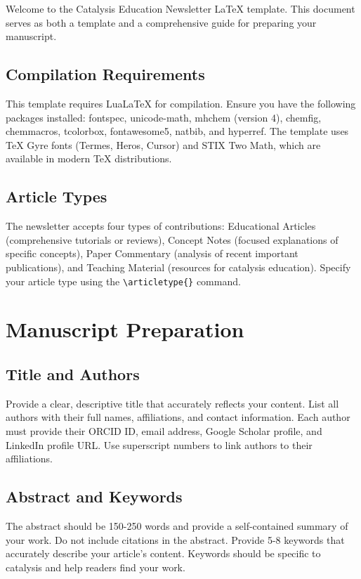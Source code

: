 \documentclass[10pt, a4paper]{article}
\begin{document}
	Welcome to the Catalysis Education Newsletter LaTeX template. This document serves as both a template and a comprehensive guide for preparing your manuscript.
	
	\subsection{Compilation Requirements} This template requires LuaLaTeX for compilation. Ensure you have the following packages installed: fontspec, unicode-math, mhchem (version 4), chemfig, chemmacros, tcolorbox, fontawesome5, natbib, and hyperref. The template uses TeX Gyre fonts (Termes, Heros, Cursor) and STIX Two Math, which are available in modern TeX distributions.
	
	\subsection{Article Types} The newsletter accepts four types of contributions: Educational Articles (comprehensive tutorials or reviews), Concept Notes (focused explanations of specific concepts), Paper Commentary (analysis of recent important publications), and Teaching Material (resources for catalysis education). Specify your article type using the \texttt{\textbackslash articletype\{\}} command.
	
	\section{Manuscript Preparation}
	
	\subsection{Title and Authors} Provide a clear, descriptive title that accurately reflects your content. List all authors with their full names, affiliations, and contact information. Each author must provide their ORCID ID, email address, Google Scholar profile, and LinkedIn profile URL. Use superscript numbers to link authors to their affiliations.
	
	\subsection{Abstract and Keywords} The abstract should be 150-250 words and provide a self-contained summary of your work. Do not include citations in the abstract. Provide 5-8 keywords that accurately describe your article's content. Keywords should be specific to catalysis and help readers find your work.
	
\end{document}
